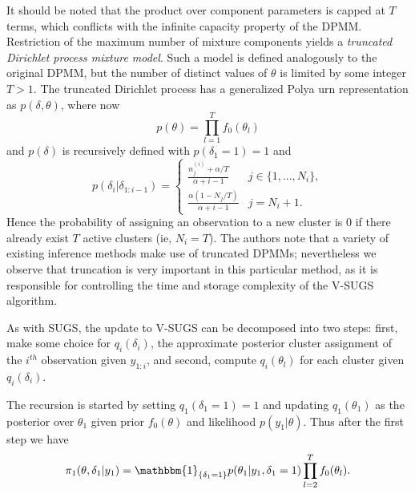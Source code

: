 \documentclass{uwstat572}
\begin{document}
It should be noted that the product over component parameters is capped at $T$ terms, which conflicts with the infinite capacity property of the DPMM. Restriction of the maximum number of mixture components yields a \textit{truncated Dirichlet process mixture model}. Such a model is defined analogously to the original DPMM, but the number of distinct values of $\theta$ is limited by some integer $T > 1$. The truncated Dirichlet process has a generalized Polya urn representation as $p(\delta,\theta)$, where now
$$ p(\theta) = \prod_{l=1}^T f_0(\theta_l)$$
and $p(\delta)$ is recursively defined with $p(\delta_1 = 1) =1$ and 
\[ p(\delta_i | \delta_{1:i-1}) = \begin{cases} 
      \frac{n_j^{(i)}+\alpha/T}{\alpha+i-1}& j \in \{1,...,N_i\}, \\
      \frac{\alpha(1-N_j/T)}{\alpha+i-1} & j = N_i +1.
   \end{cases}
\]
Hence the probability of assigning an observation to a new cluster is $0$ if there already exist $T$ active clusters (ie, $N_i = T$). The authors note that a variety of existing inference methods make use of truncated DPMMs; nevertheless we observe that truncation is very important in this particular method, as it is responsible for controlling the time and storage complexity of the V-SUGS algorithm.

As with SUGS, the update to V-SUGS can be decomposed into two steps: first, make some choice for $q_i(\delta_i)$, the approximate posterior cluster assignment of the $i^{th}$ observation given $y_{1:i}$, and second, compute $q_i(\theta_l)$ for each cluster given $q_i(\delta_i)$. 

The recursion is started by setting $q_1(\delta_1 = 1) = 1$ and updating $q_1(\theta_1)$ as the posterior over $\theta_1$ given prior $f_0(\theta)$ and likelihood $p(y_1 |\theta)$. Thus after the first step we have
$$ \pi_1(\theta,\delta_1 | y_1) = \mathbbm{1}_{\{\delta_1 = 1\}} p(\theta_1 | y_1,\delta_1 = 1)\prod_{l=2}^T f_0(\theta_l).$$
\end{document}
